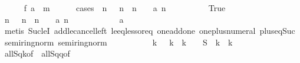 \begin{isabellebody}
\isanewline
\ \ \ \ \isamarkupfalse%
\ {\isachardoublequoteopen}{\isacharquery}f\ a\ {\isasymle}\ {\isacharquery}m{\isachardoublequoteclose}\isanewline
\ \ \ \ \isamarkupfalse%
\ {\isacharparenleft}cases\ {\isachardoublequoteopen}{\isasymforall}\ n{\isachardot}\ {}\ {\isasymle}\ n\ {\isasymand}\ n\ {\isasymle}\ {}{}{}{}\ {\isasymlongrightarrow}\ a\ n\ {\isacharequal}\ {}{\isachardoublequoteclose}{\isacharparenright}\isanewline
\ \ \ \ \ \ \isamarkupfalse%
\ True\isanewline
\ \ \ \ \ \ \isamarkupfalse%
\ \isamarkupfalse%
\ {\isachardoublequoteopen}{\isasymforall}n{\isachardot}\ {}\ {\isasymle}\ n\ {\isasymand}\ n\ {\isacharless}\ {}{}{}{}\ {\isasymlongrightarrow}\ a\ n\ {\isacharequal}\ {}{\isachardoublequoteclose}\isanewline
\ \ \ \ \ \ \ \ \isamarkupfalse%
\ {\isacharbackquoteopen}a\ {}\ {\isacharequal}\ {}{\isacharbackquoteclose}\isanewline
\ \ \ \ \ \ \ \ \isamarkupfalse%
\ {\isacharparenleft}metis\ Suc{\isacharunderscore}leI\ add{\isacharunderscore}le{\isacharunderscore}cancel{\isacharunderscore}left\ le{\isacharunderscore}eq{\isacharunderscore}less{\isacharunderscore}or{\isacharunderscore}eq\ one{\isacharunderscore}add{\isacharunderscore}one\ one{\isacharunderscore}plus{\isacharunderscore}numeral\ plus{\isacharunderscore}{}{\isacharunderscore}eq{\isacharunderscore}Suc\ semiring{\isacharunderscore}norm{\isacharparenleft}{}{\isacharparenright}\ semiring{\isacharunderscore}norm{\isacharparenleft}{}{\isacharparenright}{\isacharparenright}\isanewline
\ \ \ \ \ \ \isamarkupfalse%
\ \isamarkupfalse%
\ {\isachardoublequoteopen}{\isasymforall}\ k{\isachardot}\ {}\ {\isasymle}\ k\ {\isasymand}\ k\ {\isasymle}\ {}{}{}{}\ {\isasymlongrightarrow}\ {\isacharquery}S\ {}{}{}{}\ k\ {\isasymle}\ k{\isachardoublequoteclose}\isanewline
\ \ \ \ \ \ \ \ \isamarkupfalse%
\ all{\isacharunderscore}{}{\isacharunderscore}Sqk{\isacharbrackleft}of\ {}{}{}{}{\isacharbrackright}\ all{\isacharunderscore}{}{\isacharunderscore}Sqq{\isacharbrackleft}of\ {}{}{}{}{\isacharbrackright}\isanewline

\end{isabellebody}
